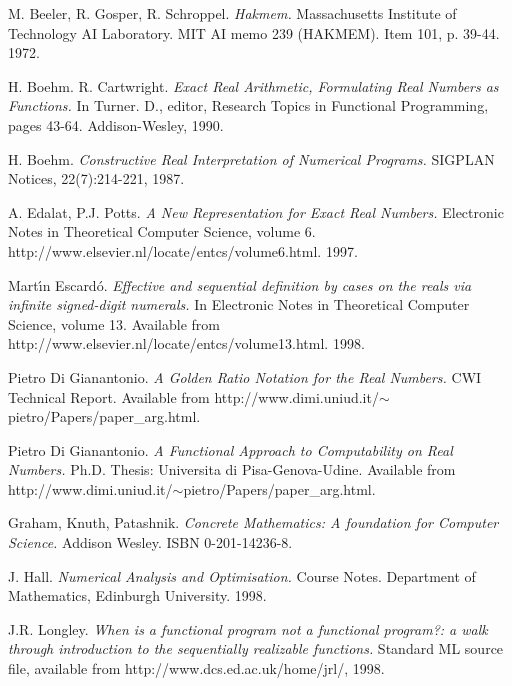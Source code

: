 \documentclass{cs4rep}
\begin{document}
\begin{thebibliography}{20}
  
 M.  Beeler, R.  Gosper, R. Schroppel. {\em
    Hakmem.} Massachusetts Institute of Technology AI Laboratory. MIT
  AI memo 239 (HAKMEM).  Item 101, p.  39-44. 1972.
  
 H. Boehm. R. Cartwright.  {\em Exact Real
    Arithmetic, Formulating Real Numbers as Functions.} In Turner. D.,
  editor, Research Topics in Functional Programming, pages 43-64.
  Addison-Wesley, 1990.
  
 H. Boehm.  {\em Constructive Real Interpretation of
    Numerical Programs.} SIGPLAN Notices, 22(7):214-221, 1987.
  
 A.  Edalat, P.J. Potts. {\em A New Representation
    for Exact Real Numbers.} Electronic Notes in Theoretical Computer
  Science, volume 6.
  http://www.elsevier.nl/locate/entcs/volume6.html. 1997.
  
 Mart\' \i n Escard\'o. {\em Effective and
    sequential definition by cases on the reals via infinite
    signed-digit numerals.} In Electronic Notes in Theoretical
  Computer Science, volume 13.  Available from
  http://www.elsevier.nl/locate/entcs/volume13.html.  1998.
  
 Pietro Di Gianantonio. {\em A Golden Ratio
    Notation for the Real Numbers.} CWI Technical Report.  Available
  from http://www.dimi.uniud.it/$\sim$pietro/Papers/paper\_arg.html.
  
 Pietro Di Gianantonio. {\em A Functional
    Approach to Computability on Real Numbers.} Ph.D. Thesis:
  Universita di Pisa-Genova-Udine. Available from
  http://www.dimi.uniud.it/$\sim$pietro/Papers/paper\_arg.html.
  
 Graham, Knuth, Patashnik. {\em Concrete
    Mathematics: A foundation for Computer Science.} Addison Wesley.
  ISBN 0-201-14236-8.
  
 J. Hall. {\em Numerical Analysis and Optimisation.}
  Course Notes. Department of Mathematics, Edinburgh University.
  1998.
  
 J.R. Longley. {\em When is a functional program
    not a functional program?: a walk through introduction to the
    sequentially realizable functions.} Standard ML source file,
  available from http://www.dcs.ed.ac.uk/home/jrl/, 1998.
  

\end{thebibliography}
\end{document}

